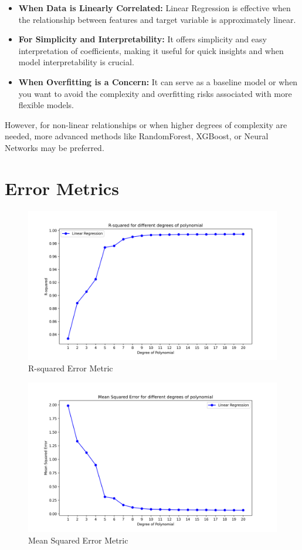 \begin{itemize}
    \item \textbf{When Data is Linearly Correlated:} Linear Regression is effective when the relationship between features and target variable is approximately linear.
    \item \textbf{For Simplicity and Interpretability:} It offers simplicity and easy interpretation of coefficients, making it useful for quick insights and when model interpretability is crucial.
    \item \textbf{When Overfitting is a Concern:} It can serve as a baseline model or when you want to avoid the complexity and overfitting risks associated with more flexible models.
\end{itemize}

However, for non-linear relationships or when higher degrees of complexity are needed, more advanced methods like RandomForest, XGBoost, or Neural Networks may be preferred.


\section*{Error Metrics}

\begin{figure}[H]
    \centering
    \includegraphics[width=0.5\linewidth]{./Images/R-squared.png}
    \caption{R-squared Error Metric}
\end{figure}

\begin{figure}[H]
    \centering
    \includegraphics[width=0.5\linewidth]{./Images/MSE.png}
    \caption{Mean Squared Error Metric}
\end{figure}


